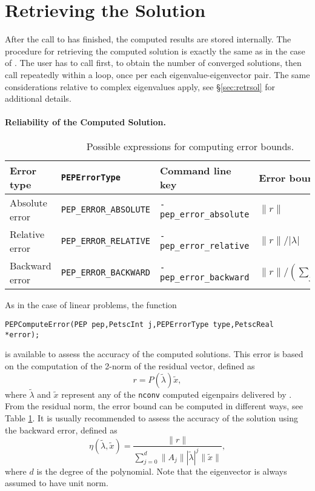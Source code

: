 \section{Retrieving the Solution}

After the call to  has finished, the computed results are stored internally. The procedure for retrieving the computed solution is exactly the same as in the case of . The user has to call  first, to obtain the number of converged solutions, then call  repeatedly within a loop, once per each eigenvalue-eigenvector pair. The same considerations relative to complex eigenvalues apply, see \S\ref{sec:retrsol} for additional details.

\paragraph{Reliability of the Computed Solution.}

\begin{table}
\centering
{\small \begin{tabular}{llll}
Error type     & \texttt{PEPErrorType}         & Command line key          & Error bound \\\hline
Absolute error & \texttt{PEP\_ERROR\_ABSOLUTE} & \texttt{-pep\_error\_absolute} & $\|r\|$ \\
Relative error & \texttt{PEP\_ERROR\_RELATIVE} & \texttt{-pep\_error\_relative} & $\|r\|/|\lambda|$ \\
Backward error & \texttt{PEP\_ERROR\_BACKWARD} & \texttt{-pep\_error\_backward} & $\|r\|/(\sum_j\|A_j\||\lambda_i|^j)$ \\
\hline
\end{tabular} }
\caption{\label{tab:peperrors}Possible expressions for computing error bounds.}
\end{table}

As in the case of linear problems, the function
	\begin{Verbatim}[fontsize=\small]
	PEPComputeError(PEP pep,PetscInt j,PEPErrorType type,PetscReal *error);
	\end{Verbatim}
is available to assess the accuracy of the computed solutions. This error is based on the computation of the 2-norm of the residual vector, defined as
\begin{equation}
r=P(\tilde{\lambda})\tilde{x},\label{eq:respol}
\end{equation}
where $\tilde{\lambda}$ and $\tilde{x}$ represent any of the \texttt{nconv} computed eigenpairs delivered by .
From the residual norm, the error bound can be computed in different ways, see Table \ref{tab:peperrors}. It is usually recommended to assess the accuracy of the solution using the backward error, defined as
\begin{equation}
\eta(\tilde{\lambda},\tilde{x})=\frac{\|r\|}{\sum_{j=0}^d\|A_j\||\tilde\lambda|^j\|\tilde{x}\|},\label{eq:backward}
\end{equation}
where $d$ is the degree of the polynomial. Note that the eigenvector is always assumed to have unit norm.

